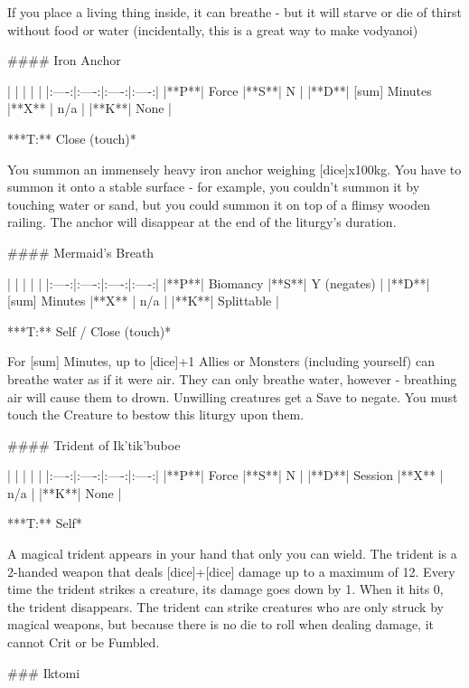 If you place a living thing inside, it can breathe - but it will starve or die of thirst without food or water (incidentally, this is a great way to make vodyanoi)





#### Iron Anchor

| | | | |
|:----:|:----:|:----:|:----:|
|**P**| Force |**S**|  N |
|**D**| [sum] Minutes |**X** |  n/a  |
|**K**| None |


***T:**   Close (touch)*



You summon an immensely heavy iron anchor weighing [dice]x100kg.  You have to summon it onto a stable surface - for example, you couldn't summon it by touching water or sand, but you could summon it on top of a flimsy wooden railing.  The anchor will disappear at the end of the liturgy's duration.




#### Mermaid's Breath

| | | | |
|:----:|:----:|:----:|:----:|
|**P**| Biomancy |**S**|  Y (negates) |
|**D**| [sum] Minutes |**X** |  n/a  |
|**K**| Splittable |

***T:**   Self / Close (touch)*



For [sum] Minutes, up to [dice]+1 Allies or Monsters (including yourself) can breathe water as if it were air.  They can only breathe water, however - breathing air will cause them to drown. Unwilling creatures get a Save to negate.  You must touch the Creature to bestow this liturgy upon them. 




#### Trident of Ik'tik'buboe

| | | | |
|:----:|:----:|:----:|:----:|
|**P**| Force |**S**|  N |
|**D**| Session |**X** |  n/a  |
|**K**| None |


***T:**   Self*



A magical trident appears in your hand that only you can wield.  The trident is a 2-handed weapon that deals [dice]+[dice] damage up to a maximum of 12. Every time the trident strikes a creature, its damage goes down by 1.  When it hits 0, the trident disappears.  The trident can strike creatures who are only struck by magical weapons, but because there is no die to roll when dealing damage, it cannot Crit or be Fumbled.



### Iktomi






